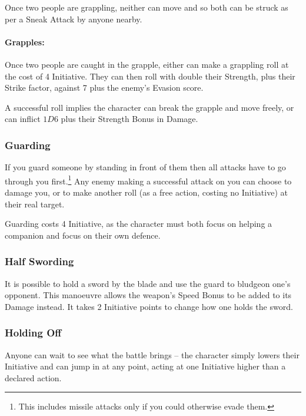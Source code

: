 \documentclass[titlepage,a4paper,openany]{book}
\begin{document}
\begin{multicols}{2}
Once two people are grappling, neither can move and so both can be struck as per a Sneak Attack by anyone nearby.

\paragraph{Grapples:}

Once two people are caught in the grapple, either can make a grappling roll at the cost of 4 Initiative.  They can then roll with double their Strength, plus their Strike factor, against 7 plus the enemy's Evasion score.

A successful roll implies the character can break the grapple and move freely, or can inflict $1D6$ plus their Strength Bonus in Damage.

\subsubsection{Guarding}

If you guard someone by standing in front of them then all attacks have to go through you first.\footnote{This includes missile attacks only if you could otherwise evade them.}  Any enemy making a successful attack on you can choose to damage you, or to make another roll (as a free action, costing no Initiative) at their real target.

Guarding costs 4 Initiative, as the character must both focus on helping a companion and focus on their own defence.

\subsubsection{Half Swording}

It is possible to hold a sword by the blade and use the guard to bludgeon one's opponent. This manoeuvre allows the weapon's Speed Bonus to be added to its Damage instead. It takes 2 Initiative points to change how one holds the sword.

\subsubsection{Holding Off}

Anyone can wait to see what the battle brings -- the character simply lowers their Initiative and can jump in at any point, acting at one Initiative higher than a declared action.


\end{multicols}
\end{document}
